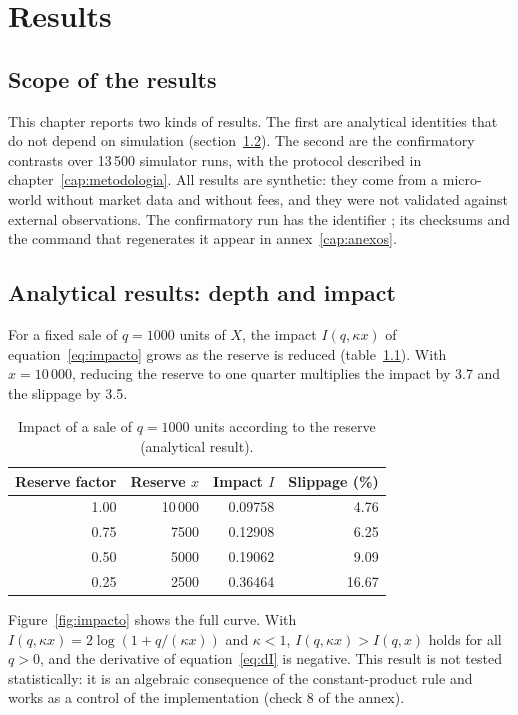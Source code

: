 \chapter{Results}
\label{cap:resultados}

\section{Scope of the results}

This chapter reports two kinds of results. The first are analytical identities that do not depend on simulation (section~\ref{sec:res-analitico}). The second are the confirmatory contrasts over 13\,500 simulator runs, with the protocol described in chapter~\ref{cap:metodologia}. All results are synthetic: they come from a micro-world without market data and without fees, and they were not validated against external observations. The confirmatory run has the identifier \code{\RunID}; its checksums and the command that regenerates it appear in annex~\ref{cap:anexos}.

\section{Analytical results: depth and impact}
\label{sec:res-analitico}

For a fixed sale of $q=1000$ units of $X$, the impact $I(q,\kappa x)$ of equation~\eqref{eq:impacto} grows as the reserve is reduced (table~\ref{tab:impacto}). With $x=10\,000$, reducing the reserve to one quarter multiplies the impact by 3.7 and the slippage by 3.5.

\begin{table}[htbp]
\centering
\caption{Impact of a sale of $q=1000$ units according to the reserve (analytical result).}
\label{tab:impacto}
\small
\begin{tabular}{@{}rrrr@{}}
\toprule
Reserve factor & Reserve $x$ & Impact $I$ & Slippage (\%) \\
\midrule
1.00 & 10\,000 & 0.09758 & 4.76 \\
0.75 & 7500 & 0.12908 & 6.25 \\
0.50 & 5000 & 0.19062 & 9.09 \\
0.25 & 2500 & 0.36464 & 16.67 \\
\bottomrule
\end{tabular}
\end{table}

Figure~\ref{fig:impacto} shows the full curve. With $I(q,\kappa x)=2\log(1+q/(\kappa x))$ and $\kappa<1$, $I(q,\kappa x)>I(q,x)$ holds for all $q>0$, and the derivative of equation~\eqref{eq:dI} is negative. This result is not tested statistically: it is an algebraic consequence of the constant-product rule and works as a control of the implementation (check 8 of the annex).

